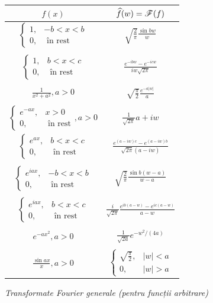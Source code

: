 \newpage

\begin{figure}[!htbp]
  \centering
  \begin{tabular}{c|c}
    $ f(x) $ & $ \widehat{f}(w) = \mathscr{F}(f) $ \\
    \hline\hline
    $ \begin{cases} 1, & -b < x < b \\ 0, &\text{ în rest} \end{cases} $ & $ \sqrt{\frac{2}{\pi}} \frac{\sin bw}{w} $ \\
             & \\
    $ \begin{cases} 1, & b < x < c \\ 0, &\text{ în rest} \end{cases} $ & $ \frac{e^{-ibw} - e^{-icw}}{iw \sqrt{2\pi}} $ \\
             & \\
    $ \frac{1}{x^2 + a^2}, a > 0 $ & $ \sqrt{\frac{\pi}{2}} \frac{e^{-a|w|}}{a} $ \\
             & \\
    $ \begin{cases} e^{-ax}, & x > 0 \\ 0, &\text{ în rest} \end{cases}, a > 0 $ & $ \frac{1}{\sqrt{2\pi}}{a + iw} $ \\
    $ \begin{cases} e^{ax}, & b < x < c \\ 0, &\text{ în rest} \end{cases} $ & $ \frac{e^{(a-iw)c} - e^{(a - iw)b}}{\sqrt{2\pi}(a - iw)} $ \\
             & \\
    $ \begin{cases} e^{iax}, & -b < x < b \\ 0, &\text{ în rest} \end{cases} $ & $ \sqrt{\frac{2}{\pi}} \frac{\sin b(w - a)}{w - a} $ \\
             & \\
    $ \begin{cases} e^{iax}, & b < x < c \\ 0, &\text{ în rest} \end{cases} $ & $ \frac{i}{\sqrt{2\pi}} \frac{e^{ib(a - w)} - e^{ic(a - w)}}{a - w} $ \\
             & \\
    $ e^{-ax^2}, a > 0 $ & $ \frac{1}{\sqrt{2a}} e^{-w^2/(4a)} $ \\
             & \\
    $ \frac{\sin ax}{x}, a > 0 $ & $ \begin{cases} \sqrt{\frac{\pi}{2}}, & |w| < a \\ 0, & |w| > a \end{cases} $
  \end{tabular}
  \caption{\emph{Transformate Fourier generale (pentru funcții arbitrare)}}
\end{figure}



